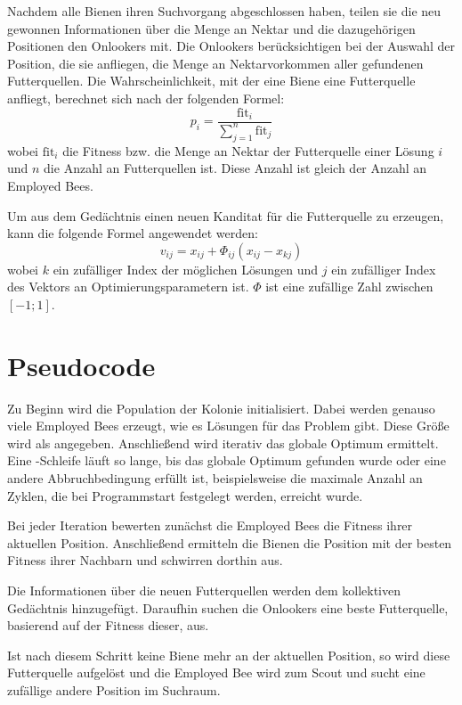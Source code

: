 Nachdem alle Bienen ihren Suchvorgang abgeschlossen haben, teilen sie die
neu gewonnen Informationen über die Menge an Nektar und die dazugehörigen
Positionen den Onlookers mit. Die Onlookers berücksichtigen bei der Auswahl der
Position, die sie anfliegen, die Menge an Nektarvorkommen aller gefundenen
Futterquellen. Die Wahrscheinlichkeit, mit der eine Biene eine Futterquelle
anfliegt, berechnet sich nach der folgenden Formel:
\begin{equation}
    p_i = \frac{\mathrm{fit}_i}{\sum_{j=1}^n \mathrm{fit}_j}
\end{equation}
wobei $\mathrm{fit}_i$ die Fitness bzw. die Menge an Nektar der Futterquelle
einer Lösung $i$ und $n$ die Anzahl an Futterquellen ist. Diese Anzahl ist
gleich der Anzahl an Employed Bees.

Um aus dem Gedächtnis einen neuen Kanditat für die Futterquelle zu erzeugen,
kann die folgende Formel angewendet werden:
\begin{equation}
    v_{ij} = x_{ij} + \Phi_{ij}(x_{ij} - x_{kj})
\end{equation}
wobei $k$ ein zufälliger Index der möglichen Lösungen und $j$ ein zufälliger
Index des Vektors an Optimierungsparametern ist. $\Phi$ ist eine zufällige
Zahl zwischen $[-1;1]$.

\section{Pseudocode}

Zu Beginn wird die Population der Kolonie initialisiert. Dabei werden genauso
viele Employed Bees erzeugt, wie es Lösungen für das Problem gibt. Diese
Größe wird als  angegeben.
Anschließend wird iterativ das globale Optimum ermittelt. Eine
-Schleife läuft so lange, bis das globale Optimum gefunden wurde
oder eine andere Abbruchbedingung erfüllt ist, beispielsweise die maximale
Anzahl an Zyklen, die bei Programmstart festgelegt werden, erreicht wurde.

Bei jeder Iteration bewerten zunächst die Employed Bees die Fitness ihrer
aktuellen Position. Anschließend ermitteln die Bienen die Position mit der
besten Fitness ihrer Nachbarn und schwirren dorthin aus.

Die Informationen über die neuen Futterquellen werden dem kollektiven
Gedächtnis hinzugefügt. Daraufhin suchen die Onlookers eine beste
Futterquelle, basierend auf der Fitness dieser, aus.

Ist nach diesem Schritt keine Biene mehr an der aktuellen Position, so wird
diese Futterquelle aufgelöst und die Employed Bee wird zum Scout und sucht
eine zufällige andere Position im Suchraum.

